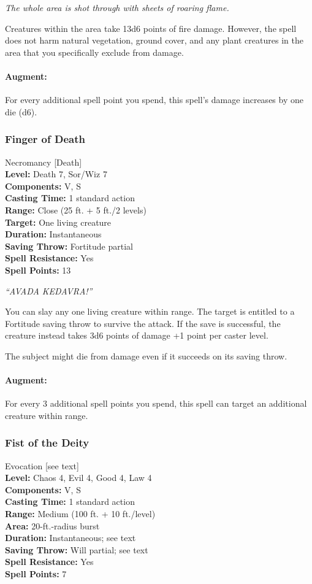 \emph{The whole area is shot through with sheets of roaring flame.} 

Creatures within the area take 13d6 points of fire damage.
However, the spell does not harm natural vegetation, ground cover, and any plant creatures in the area that you specifically exclude from damage.

\paragraph{Augment:} For every additional spell point you spend, this spell's damage increases by one die (d6).
\subsubsection{Finger of Death}
\label{Spell:FingerOfDeath}
Necromancy [Death]
\\ \textbf{Level:} Death 7, Sor/Wiz 7
\\ \textbf{Components:} V, S
\\ \textbf{Casting Time:} 1 standard action
\\ \textbf{Range:} Close (25 ft. + 5 ft./2 levels)
\\ \textbf{Target:} One living creature
\\ \textbf{Duration:} Instantaneous
\\ \textbf{Saving Throw:} Fortitude partial
\\ \textbf{Spell Resistance:} Yes
\\ \textbf{Spell Points:} 13

\emph{``AVADA KEDAVRA!''}

You can slay any one living creature within range. 
The target is entitled to a Fortitude saving throw to survive the attack. 
If the save is successful, the creature instead takes 3d6 points of damage +1 point per caster level.

The subject might die from damage even if it succeeds on its saving throw. 

\paragraph{Augment:} For every 3 additional spell points you spend, this spell can target an additional creature within range.
\subsubsection{Fist of the Deity}
\label{Spell:FistOfTheDeity}
Evocation [see text]
\\ \textbf{Level:} Chaos 4, Evil 4, Good 4, Law 4
\\ \textbf{Components:} V, S
\\ \textbf{Casting Time:} 1 standard action
\\ \textbf{Range:} Medium (100 ft. + 10 ft./level)
\\ \textbf{Area:} 20-ft.-radius burst
\\ \textbf{Duration:} Instantaneous; see text
\\ \textbf{Saving Throw:} Will partial; see text
\\ \textbf{Spell Resistance:} Yes
\\ \textbf{Spell Points:} 7

